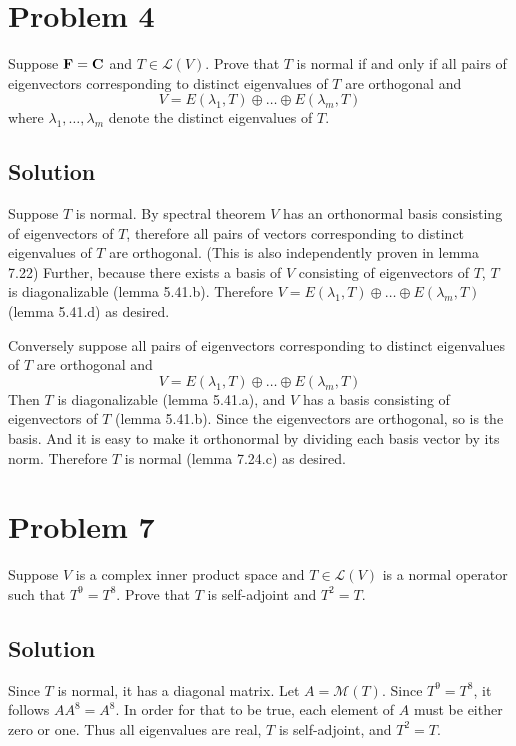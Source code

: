 \documentclass{article}
\begin{document}
\section*{Problem 4}
Suppose $\mathbf{F}=\mathbf{C}$ and $T\in\mathcal{L}(V)$. Prove that $T$ is normal if and only if all pairs of eigenvectors corresponding to distinct eigenvalues of $T$ are orthogonal and
\[V=E(\lambda_1, T)\oplus\ldots\oplus E(\lambda_m, T)\]
where $\lambda_1,\ldots,\lambda_m$ denote the distinct eigenvalues of $T$.

\subsection*{Solution}
Suppose $T$ is normal. By spectral theorem $V$ has an orthonormal basis consisting of eigenvectors of $T$, therefore all pairs of vectors corresponding to distinct eigenvalues of $T$ are orthogonal. (This is also independently proven in lemma 7.22) Further, because there exists a basis of $V$ consisting of eigenvectors of $T$, $T$ is diagonalizable (lemma 5.41.b). Therefore $V=E(\lambda_1, T)\oplus\ldots\oplus E(\lambda_m, T)$ (lemma 5.41.d) as desired.

\vs

Conversely suppose all pairs of eigenvectors corresponding to distinct eigenvalues of $T$ are orthogonal and
\[V=E(\lambda_1, T)\oplus\ldots\oplus E(\lambda_m, T)\]
Then $T$ is diagonalizable (lemma 5.41.a), and $V$ has a basis consisting of eigenvectors of $T$ (lemma 5.41.b). Since the eigenvectors are orthogonal, so is the basis. And it is easy to make it orthonormal by dividing each basis vector by its norm. Therefore $T$ is normal (lemma 7.24.c) as desired.

\section*{Problem 7}
Suppose $V$ is a complex inner product space and $T\in\mathcal{L}(V)$ is a normal operator such that $T^9=T^8$. Prove that $T$ is self-adjoint and $T^2=T$.

\subsection*{Solution}
Since $T$ is normal, it has a diagonal matrix. Let $A=\mathcal{M}(T)$. Since $T^9=T^8$, it follows $AA^8=A^8$. In order for that to be true, each element of $A$ must be either zero or one. Thus all eigenvalues are real, $T$ is self-adjoint, and $T^2=T$.
\end{document}
